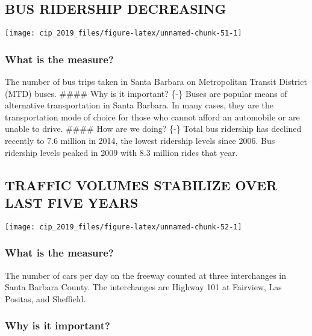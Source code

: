 \documentclass[]{book}
\theoremstyle{definition}
\theoremstyle{definition}
\theoremstyle{definition}
\theoremstyle{remark}
\begin{document}
\subsection*{BUS RIDERSHIP DECREASING}\label{bus-ridership-decreasing}

\texttt{[image: cip\_2019\_files/figure-latex/unnamed-chunk-51-1]}

\subsubsection*{What is the measure?}\label{what-is-the-measure-26}

The number of bus trips taken in Santa Barbara on Metropolitan Transit
District (MTD) buses. \#\#\#\# Why is it important? \{-\} Buses are
popular means of alternative transportation in Santa Barbara. In many
cases, they are the transportation mode of choice for those who cannot
afford an automobile or are unable to drive. \#\#\#\# How are we doing?
\{-\} Total bus ridership has declined recently to 7.6 million in 2014,
the lowest ridership levels since 2006. Bus ridership levels peaked in
2009 with 8.3 million rides that year.

\subsection*{TRAFFIC VOLUMES STABILIZE OVER LAST FIVE
YEARS}\label{traffic-volumes-stabilize-over-last-five-years}

\texttt{[image: cip\_2019\_files/figure-latex/unnamed-chunk-52-1]}

\subsubsection*{What is the measure?}\label{what-is-the-measure-27}

The number of cars per day on the freeway counted at three interchanges
in Santa Barbara County. The interchanges are Highway 101 at Fairview,
Las Positas, and Sheffield.

\subsubsection*{Why is it important?}\label{why-is-it-important-25}
\end{document}
